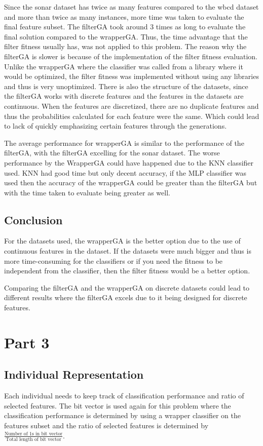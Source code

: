 \documentclass{article}
\begin{document}
Since the sonar dataset has twice as many features compared to the wbcd dataset and more than twice as many instances, more time was taken to evaluate the final feature subset. The filterGA took around 3 times as long to evaluate the final solution compared to the wrapperGA. Thus, the time advantage that the filter fitness usually has, was not applied to this problem. The reason why the filterGA is slower is because of the implementation of the filter fitness evaluation. Unlike the wrapperGA where the classifier was called from a library where it would be optimized, the filter fitness was implemented without using any libraries and thus is very unoptimized. There is also the structure of the datasets, since the filterGA works with discrete features and the features in the datasets are continuous. When the features are discretized, there are no duplicate features and thus the probabilities calculated for each feature were the same. Which could lead to lack of quickly emphasizing certain features through the generations. \par
\noindent The average performance for wrapperGA is similar to the performance of the filterGA, with the filterGA excelling for the sonar dataset. The worse performance by the WrapperGA could have happened due to the KNN classifier used. KNN had good time but only decent accuracy, if the MLP classifier was used then the accuracy of the wrapperGA could be greater than the filterGA but with the time taken to evaluate being greater as well. \par
\subsection*{Conclusion}
For the datasets used, the wrapperGA is the better option due to the use of continuous features in the dataset. If the datasets were much bigger and thus is more time-consuming for the classifiers or if you need the fitness to be independent from the classifier, then the filter fitness would be a better option. \par
\noindent Comparing the filterGA and the wrapperGA on discrete datasets could lead to different results where the filterGA excels due to it being designed for discrete features. \par
\section*{Part 3}
\subsection*{Individual Representation}
Each individual needs to keep track of classification performance and ratio of selected features. The bit vector is used again for this problem where the classification performance is determined by using a wrapper classifier on the features subset and the ratio of selected features is determined by $\frac{\text{Number of 1s in bit vector}}{\text{Total length of bit vector}}$.
\end{document}
